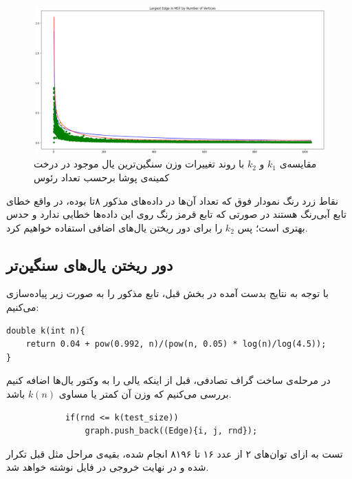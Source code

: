 \documentclass{article}
\begin{document}
\begin{figure}[H]
    \centering
    \includegraphics[width=0.999\linewidth]{Photos/Randomized mst/k_n_result.png}
    \caption{
    مقایسه‌ی
    $k_1$
    و
    $k_2$
    با روند تغییرات وزن سنگین‌ترین یال موجود در درخت کمینه‌ی پوشا برحسب تعداد رئوس
    }
    \label{fig:my_label}
\end{figure}

نقاط زرد رنگ نمودار فوق که تعداد آن‌ها در داده‌های مذکور ۸تا بوده، در واقع خطای تابع آبی‌رنگ هستند در صورتی که تابع قرمز رنگ روی این داده‌ها خطایی ندارد و حدس بهتری است؛ پس
$k_2$
را برای دور ریختن یال‌های اضافی استفاده خواهیم کرد.
\subsection{دور ریختن یال‌های سنگین‌تر}
با توجه به نتایج بدست آمده در بخش قبل، تابع مذکور را به صورت زیر پیاده‌سازی می‌کنیم:

\begin{latin}
\begin{verbatim}
double k(int n){
    return 0.04 + pow(0.992, n)/(pow(n, 0.05) * log(n)/log(4.5));
}
\end{verbatim}
\end{latin}

در مرحله‌ی ساخت گراف تصادفی، قبل از اینکه یالی را به وکتور یال‌ها اضافه کنیم بررسی می‌کنیم که وزن آن کمتر یا مساوی
$k(n)$
باشد.

\begin{latin}
\begin{verbatim}
            if(rnd <= k(test_size))
                graph.push_back((Edge){i, j, rnd});
\end{verbatim}
\end{latin}

تست به ازای توان‌های ۲ از عدد ۱۶ تا ۸۱۹۶ انجام شده، بقیه‌ی مراحل مثل قبل تکرار شده و در نهایت خروجی در فایل
نوشته خواهد شد.
\end{document}
